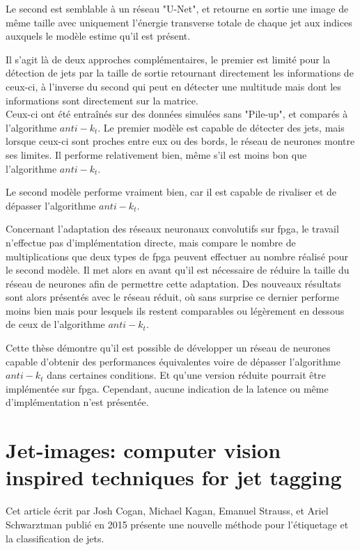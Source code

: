 Le second est semblable à un réseau "U-Net", et retourne en sortie une image de même taille avec uniquement l'énergie transverse totale de chaque jet aux indices auxquels le modèle estime qu'il est présent.

Il s'agit là de deux approches complémentaires, le premier est limité pour la détection de jets par la taille de sortie retournant directement les informations de ceux-ci, à l'inverse du second qui peut en détecter une multitude mais dont les informations sont directement sur la matrice.\\

Ceux-ci ont été entraînés sur des données simulées sans "Pile-up", et comparés à l'algorithme $anti-k_t$. Le premier modèle est capable de détecter des jets, mais lorsque ceux-ci sont proches entre eux ou des bords, le réseau de neurones montre ses limites. Il performe relativement bien, même s'il est moins bon que l'algorithme $anti-k_t$.

Le second modèle performe vraiment bien, car il est capable de rivaliser et de dépasser l'algorithme $anti-k_t$.

Concernant l'adaptation des réseaux neuronaux convolutifs sur \acrshort{fpga}, le travail n'effectue pas d'implémentation directe, mais compare le nombre de multiplications que deux types de \acrshort{fpga} peuvent effectuer au nombre réalisé pour le second modèle. Il met alors en avant qu'il est nécessaire de réduire la taille du réseau de neurones afin de permettre cette adaptation. Des nouveaux résultats sont alors présentés avec le réseau réduit, où sans surprise ce dernier performe moins bien mais pour lesquels ils restent comparables ou légèrement en dessous de ceux de l'algorithme $anti-k_t$.

Cette thèse démontre qu'il est possible de développer un réseau de neurones capable d'obtenir des performances équivalentes voire de dépasser l'algorithme $anti-k_t$ dans certaines conditions. Et qu'une version réduite pourrait être implémentée sur \acrshort{fpga}. Cependant, aucune indication de la latence ou même d'implémentation n'est présentée.

\section{Jet-images: computer vision inspired techniques for jet tagging \cite{cogan_jet-images_2015}} 

Cet article écrit par Josh Cogan, Michael Kagan, Emanuel Strauss, et Ariel Schwarztman publié en 2015 présente une nouvelle méthode pour l'étiquetage et la classification de jets.

